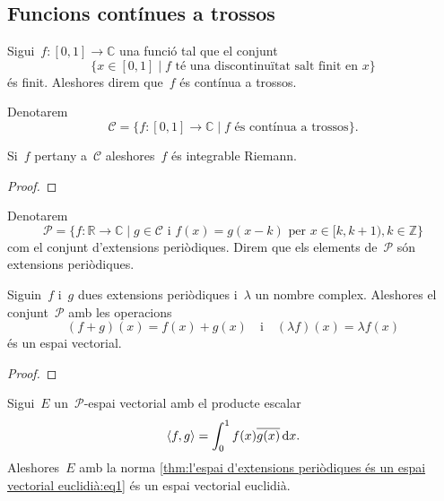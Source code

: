 \documentclass[../../main.tex]{subfiles}
\begin{document}
    \subsection{Funcions contínues a trossos}
    \begin{definition}
        \label{def:funció contínua a trossos}
        Sigui~\(f\colon[0,1]\longrightarrow\mathbb{C}\) una funció tal que el conjunt
        \[
            \{x\in[0,1]\mid f\text{ té una discontinuïtat salt finit en }x\}
        \]
        és finit.
        Aleshores direm que~\(f\) és contínua a trossos.

        Denotarem
        \[
            \mathcal{C}=\{f\colon[0,1]\longrightarrow\mathbb{C}\mid f\text{ és contínua a trossos}\}.
        \]
    \end{definition}
    \begin{observation}
        \label{obs:les funcions contínues a trossos són integrables}
        Si~\(f\) pertany a~\(\mathcal{C}\) aleshores~\(f\) és integrable Riemann.
    \end{observation}
    \begin{proof}
    \end{proof}
    \begin{definition}
        \label{def:conjunt d'extensions periòdiques}
        Denotarem
        \label{def:extensió periòdica}
        \[
            \mathcal{P}=\{f\colon\mathbb{R}\longrightarrow\mathbb{C}\mid g\in\mathcal{C}\text{ i }f(x)=g(x-k)\text{ per }x\in[k,k+1),k\in\mathbb{Z}\}
        \]
        com el conjunt d'extensions periòdiques.
        Direm que els elements de~\(\mathcal{P}\) són extensions periòdiques.
    \end{definition}
    \begin{lemma}
        \label{lema:l'espai d'extensions periòdiques és un espai vectorial}
        Siguin~\(f\) i~\(g\) dues extensions periòdiques i~\(\lambda\) un nombre complex.
        Aleshores el conjunt~\(\mathcal{P}\) amb les operacions
        \[
            (f+g)(x)=f(x)+g(x)\quad\text{i}\quad(\lambda f)(x)=\lambda f(x)
        \]
        és un espai vectorial.
    \end{lemma}
    \begin{proof}
    \end{proof}
    \begin{theorem}
        \label{thm:l'espai d'extensions periòdiques és un espai vectorial euclidià}
        Sigui~\(E\) un~\(\mathcal{P}\)-espai vectorial amb el producte escalar
        \begin{equation}
            \label{thm:l'espai d'extensions periòdiques és un espai vectorial euclidià:eq1}
            \langle f,g\rangle=\int_{0}^{1}f(x)\overline{g(x)}\mathop{}\!\mathrm{d} x.
        \end{equation}
        Aleshores~\(E\) amb la norma \eqref{thm:l'espai d'extensions periòdiques és un espai vectorial euclidià:eq1} és un espai vectorial euclidià.
    \end{theorem}
\end{document}
